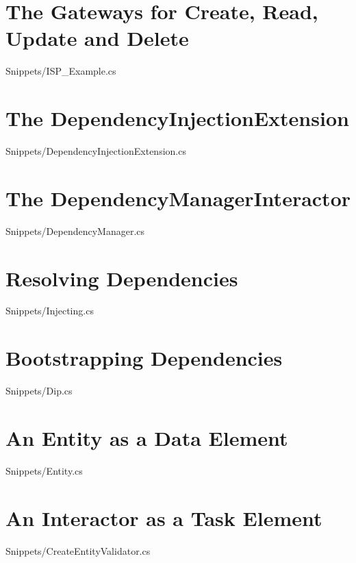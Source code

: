 \section{The Gateways for Create, Read, Update and Delete}

{Snippets/ISP_Example.cs}

\section{The DependencyInjectionExtension}

{Snippets/DependencyInjectionExtension.cs}

\section{The DependencyManagerInteractor}

{Snippets/DependencyManager.cs}

\section{Resolving Dependencies}

{Snippets/Injecting.cs}

\section{Bootstrapping Dependencies}
 {Snippets/Dip.cs}

\section{An Entity as a Data Element}

{Snippets/Entity.cs}

\section{An Interactor as a Task Element}

{Snippets/CreateEntityValidator.cs}

